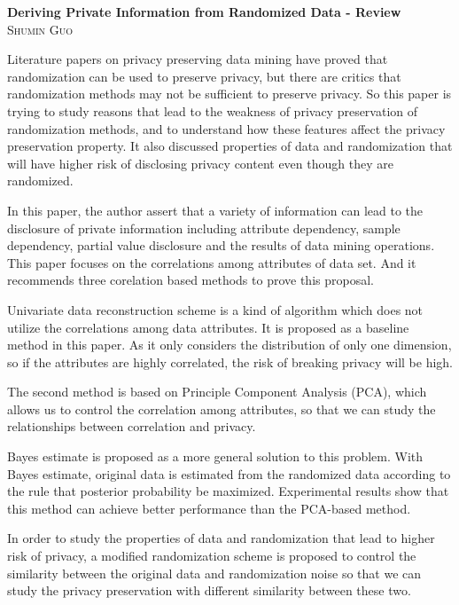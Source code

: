 \documentclass[12pt]{article}
\begin{document}
\begin{center}                  %
\textbf{\large{Deriving Private Information from Randomized Data - Review}} \\ 
\small\textsc{Shumin Guo} \\
\end{center}

Literature papers on privacy preserving data mining have proved
that randomization can be used to preserve privacy, but there are
critics that randomization methods may not be sufficient to
preserve privacy. So this paper is trying to study reasons that lead
to the weakness of privacy preservation of randomization methods, and
to understand how these features affect the privacy preservation 
property. It also discussed properties of data and randomization that
will have higher risk of disclosing privacy content even though they
are randomized.

In this paper, the author assert that a variety of information can
lead to the disclosure of private information including attribute
dependency, sample dependency, partial value disclosure and the
results of data mining operations. This paper focuses on the
correlations among attributes of data set. And it recommends three
corelation based methods to prove this proposal.  

Univariate data reconstruction scheme is a kind of algorithm which
does not utilize the correlations among data attributes. It is
proposed as a baseline method in this paper. As it only considers the
distribution of only one dimension, so if the attributes are highly
correlated, the risk of breaking privacy will be high. 

The second method is based on Principle Component Analysis (PCA),
which allows us to control the correlation among attributes, so that
we can study the relationships between correlation and privacy. 

Bayes estimate is proposed as a more general solution to this problem.
With Bayes estimate, original data is estimated from the randomized
data according to the rule that posterior probability be
maximized. Experimental results show that this method can achieve 
better performance than the PCA-based method. 

In order to study the properties of data and randomization that lead
to higher risk of privacy, a modified randomization scheme is proposed
to control the similarity between the original data and randomization
noise so that we can study the privacy preservation with different
similarity between these two. 
\end{document}
